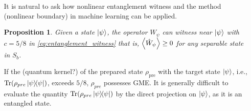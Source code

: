 \documentclass[
10pt,
aps,
pra,
linenumbers,
floatfix,
]{revtex4-2}
\theoremstyle{plain}
\newtheorem{proposition}{Proposition}
\theoremstyle{definition}
\newcommand{\ew}{\hat{W}}
\newcommand{\dm}{\rho}
\begin{document}
It is natural to ask how nonlinear entanglement witness \cite{guhneNonlinearEntanglementWitnesses2006}  and the  method (nonlinear boundary) in machine learning can be applied. 

\begin{proposition}\label{thm:entanglement_witness_gme}
	Given a state $\ket{\psi}$,
	the  operator $\ew_{\psi}$ can witness   near $\ket{\psi}$ with $c=5/8$ in \cref{eq:entanglement_witness}
	that is, $\expval{\ew_{\psi}}\ge 0$ for any separable state in $S_b$.
\end{proposition}
If the  (quantum kernel?) of the prepared state $\dm_{\text{pre}}$ with the target state $\ket{\psi}$, i.e., $\Tr(\dm_{pre}\op{\psi})$, exceeds $5/8$, $\dm_{pre}$ possesses GME.
It is generally difficult to evaluate the quantity $\Tr(\dm_{pre}\op{\psi})$ by the direct projection on $\ket{\psi}$, as it is an entangled state.
\end{document}
